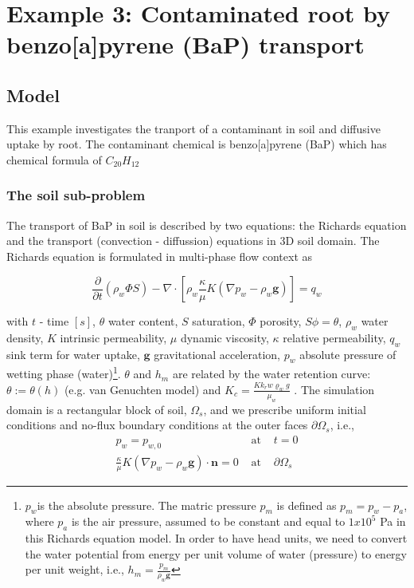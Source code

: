 \chapter*{Example 3: Contaminated root by benzo{[}a{]}pyrene (BaP) transport}

\section*{Model}

This example investigates the tranport of a contaminant in soil and
diffusive uptake by root. The contaminant chemical is benzo{[}a{]}pyrene
(BaP) which has chemical formula of $C_{20}H_{12}$

\subsection*{The soil sub-problem}

The transport of BaP in soil is described by two equations: the Richards
equation and the transport (convection - diffussion) equations in
3D soil domain. The Richards equation is formulated in multi-phase
flow context as

\[
\frac{\partial}{\partial t}\left(\rho_{w}\Phi S\right)-\nabla\cdot\left[\rho_{w}\frac{\kappa}{\mu}K\left(\nabla p_{w}-\rho_{w}\boldsymbol{g}\right)\right]=q_{w}
\]

with $t$ - time $[s]$, $\theta$ water content, $S$ saturation,
$\Phi$ porosity, $S\phi=\theta$, $\rho_{w}$ water density, $K$
intrinsic permeability, $\mu$ dynamic viscosity, $\kappa$ relative
permeability, $q_{w}$ sink term for water uptake, $\boldsymbol{g}$
gravitational acceleration, $p_{w}$ absolute pressure of wetting
phase (water)\footnote{$p_{w}$is the absolute pressure. The matric pressure $p_{m}$ is
defined as $p_{m}=p_{w}-p_{a}$, where $p_{a}$ is the air pressure,
assumed to be constant and equal to $1x10^{5}$ Pa in this Richards
equation model. In order to have head units, we need to convert the
water potential from energy per unit volume of water (pressure) to
energy per unit weight, i.e., $h_{m}=\frac{p_{m}}{\rho_{w}\boldsymbol{g}}$}. $\theta$ and $h_{m}$ are related by the water retention curve:
$\theta:=\theta(h)$ (e.g. van Genuchten model) and $K_{c}=\frac{Kk_{r}w\varrho_{w}g}{\mu_{w}}$
. The simulation domain is a rectangular block of soil, $\Omega_{s}$,
and we prescribe uniform initial conditions and no-flux boundary conditions
at the outer faces $\partial\Omega_{s}$, i.e., 
\begin{eqnarray}
p_{w}=p_{w,0} & \text{ at } & t=0\\
\frac{\kappa}{\mu}K\left(\nabla p_{w}-\rho_{w}\boldsymbol{g}\right) \cdot \mathbf{n}=0 & \text{ at } & \partial\Omega_{s}
\end{eqnarray}

